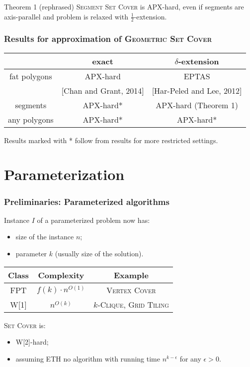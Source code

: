 \documentclass{beamer}
\begin{document}
\begin{frame}
\begin{block}{Theorem 1 (rephrased)}
	\textsc{Segment Set Cover} is APX-hard, even if segments are axis-parallel
	and problem is relaxed with $\frac{1}{2}$-extension.
\end{block}


\end{frame}


\begin{frame}
\frametitle{Results for approximation of \textsc{Geometric Set Cover}}
\begin{tabular}{|c|c|c|}
\hline
           & exact & $\delta$-extension \\
\hline
fat polygons & APX-hard  &  EPTAS \\
& [Chan and Grant, 2014] & [Har-Peled and Lee, 2012] \\
\hline
segments & \textcolor{olivegreen}{APX-hard*} & \textcolor{olivegreen}{APX-hard (Theorem 1)} \\
\hline
any polygons & APX-hard* &  \textcolor{olivegreen}{APX-hard*} \\
\hline
\end{tabular}

\bigskip
Results marked with * follow from results for more restricted settings.

\end{frame}

\section{Parameterization}

\begin{frame}
\frametitle{Preliminaries: Parameterized algorithms}
Instance $I$ of a parameterized problem now has:
\begin{itemize}
\item size of the instance $n$;
\item parameter $k$ (usually size of the solution).
\end{itemize}
\bigskip


\begin{tabular}{|c|c|c|}
\hline
\textbf{Class} & \textbf{Complexity} & \textbf{Example}\\
\hline
FPT & $f(k) \cdot n^{O(1)}$ & \textsc{Vertex Cover}\\
\hline
W[1] & $n^{O(k)}$ & \textsc{$k$-Clique}, \textsc{Grid Tiling}\\
\hline
\end{tabular}

\pause

\bigskip
\textsc{Set Cover} is:
\begin{itemize}
\item W[2]-hard;
\item assuming ETH no algorithm with running time $n^{k -\epsilon}$ for any $\epsilon > 0$.
\end{itemize}
\end{frame}
\end{document}
